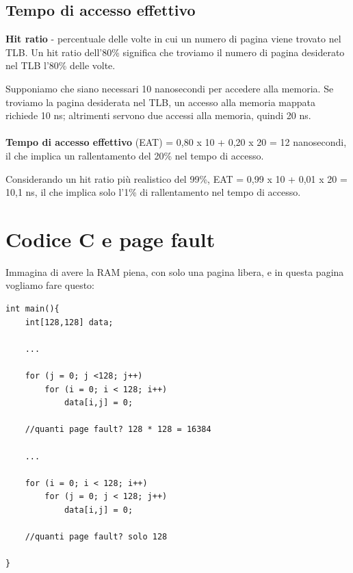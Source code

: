 

\subsection{Tempo di accesso effettivo}


\textbf{Hit ratio} - percentuale delle volte in cui un numero di pagina viene trovato nel TLB. Un hit ratio dell'80\% significa che troviamo il numero di pagina desiderato nel TLB l'80\% delle volte.

Supponiamo che siano necessari 10 nanosecondi per accedere alla memoria. Se troviamo la pagina desiderata nel TLB, un accesso alla memoria mappata richiede 10 ns; altrimenti servono due accessi alla memoria, quindi 20 ns.

\paragraph{}
\textbf{Tempo di accesso effettivo} (EAT) = 0,80 x 10 + 0,20 x 20 = 12 nanosecondi, il che implica un rallentamento del 20\% nel tempo di accesso.

Considerando un hit ratio più realistico del 99\%, EAT = 0,99 x 10 + 0,01 x 20 = 10,1 ns, il che implica solo l'1\% di rallentamento nel tempo di accesso.

\section{Codice C e page fault}

Immagina di avere la RAM piena, con solo una pagina libera, e in questa pagina vogliamo fare questo:

\begin{verbatim}
int main(){
    int[128,128] data;

    ...

    for (j = 0; j <128; j++)
        for (i = 0; i < 128; i++)
            data[i,j] = 0;
 
    //quanti page fault? 128 * 128 = 16384

    ...

    for (i = 0; i < 128; i++)
        for (j = 0; j < 128; j++)
            data[i,j] = 0;

    //quanti page fault? solo 128

}   
\end{verbatim}

